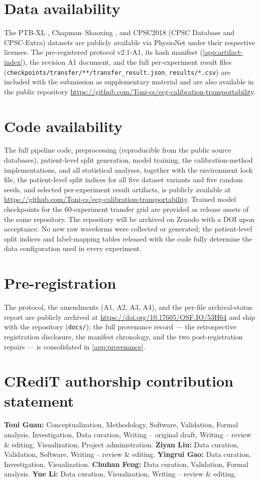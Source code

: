 \documentclass[final,5p,times,nonatbib]{elsarticle}
\begin{document}
\section*{Data availability}
The PTB-XL \cite{wagner2020ptbxl}, Chapman--Shaoxing
\cite{zheng2022ecgarrhythmia}, and CPSC2018 (CPSC Database and CPSC-Extra)
\cite{liu2018cpsc,physionet2020cpsc} datasets are publicly
available via PhysioNet under their respective licenses. The
pre-registered protocol v2.1-A1, its hash manifest
(\ref{app:artifact-index}), the revision A1 document,
and the full per-experiment result files
(\texttt{checkpoints/transfer/**/}\allowbreak\texttt{transfer\_result.json},
\texttt{results/*.csv}) are included with the submission as
supplementary material and are also available in the public repository
\url{https://github.com/Toni-cs/ecg-calibration-transportability}.
\section*{Code availability}
The full pipeline code, preprocessing (reproducible from the
public source databases), patient-level split generation, model
training, the calibration-method implementations, and all statistical
analyses, together with the environment lock file, the patient-level
split indices for all five dataset variants and five random seeds, and
selected per-experiment result artifacts, is publicly available at
\url{https://github.com/Toni-cs/ecg-calibration-transportability}.
Trained model checkpoints for the 60-experiment transfer grid are
provided as release assets of the same repository. The repository will
be archived on Zenodo with a DOI upon acceptance. No new raw
waveforms were collected or generated; the patient-level split
indices and label-mapping tables released with the code fully
determine the data configuration used in every experiment.

\section*{Pre-registration}
The protocol, the amendments (A1, A2, A3, A4), and the per-file
archival-status report are publicly archived at
\url{https://doi.org/10.17605/OSF.IO/53H64} and ship with the repository
(\texttt{docs/}); the full provenance record --- the retrospective registration disclosure, the manifest chronology, and the two
post-registration repairs --- is consolidated in
\ref{app:provenance}.
\section*{CRediT authorship contribution statement}
\textbf{Toni Guan:} Conceptualization, Methodology, Software, Validation,
Formal analysis, Investigation, Data curation, Writing -- original draft,
Writing -- review \& editing, Visualization, Project administration.
\textbf{Ziyan Liu:} Data curation, Validation, Software, Writing -- review \& editing.
\textbf{Yingrui Gao:} Data curation, Investigation, Visualization.
\textbf{Chuhan Feng:} Data curation, Validation, Formal analysis.
\textbf{Yue Li:} Data curation, Visualization, Writing -- review \& editing.
\end{document}
